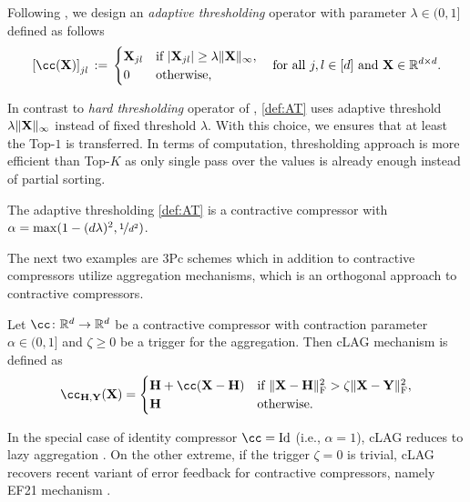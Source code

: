 \documentclass[11pt]{article}
\begin{document}
	
	\begin{example}\label{ex:AT}
		Following \citet{Sahu2021threshold}, we design an {\em adaptive thresholding} operator with parameter $\lambda \in (0,1]$ defined as follows
		\begin{equation}\label{def:AT}
			\left[\cc(\mX)\right]_{jl} \eqdef
			\begin{cases}
				\mX_{jl} & \text{if } |\mX_{jl}| \geq \lambda\|\mX\|_\infty, \\
				0 & \text{otherwise},
			\end{cases}
			\quad \text{for all } j,l\in[d] \text{ and } \mX\in\R^{d\times d}.
		\end{equation}
	\end{example}
	In contrast to {\em hard thresholding} operator of \citet{Sahu2021threshold}, \eqref{def:AT} uses adaptive threshold $\lambda\|\mathbf{X}\|_\infty$ instead of fixed threshold $\lambda$. With this choice, we ensures that at least the Top-$1$ is transferred. In terms of computation, thresholding approach is more efficient than Top-$K$ as only single pass over the values is already enough instead of partial sorting.
	
	\begin{lemma}\label{lem:3Pc__AT}
		The adaptive thresholding \eqref{def:AT} is a contractive compressor with $\alpha = \max(1-(d\lambda)^2,\nicefrac{1}{d^2})$.
	\end{lemma}
	
	The next two examples are 3Pc schemes which in addition to contractive compressors utilize aggregation mechanisms, which is an orthogonal approach to contractive compressors.
	
	\begin{example}\label{ex:cLAG}
		Let $\cc\colon\R^d\to\R^d$ be a contractive compressor with contraction parameter $\alpha\in(0,1]$ and $\zeta\ge0$ be a trigger for the aggregation. Then cLAG mechanism is defined as
		\begin{equation}\label{def:3Pc__cLAG}
			\cc_{\mH,\mY}(\mX) = 
			\begin{cases}
				\mH + \cc(\mX-\mH) & \text{if } \|\mX-\mH\|^2_{\rm F} > \zeta\|\mX-\mY\|^2_{\rm F}, \\
				\mH & \text{otherwise}.
			\end{cases}
		\end{equation}
	\end{example}
	In the special case of identity compressor $\cc=\textrm{Id}$ (i.e., $\alpha=1$), cLAG reduces to lazy aggregation \citep{chen2018LAG}. On the other extreme, if the trigger $\zeta=0$ is trivial, cLAG recovers recent variant of error feedback for contractive compressors, namely EF21 mechanism \citep{EF21}.
	
\end{document}
